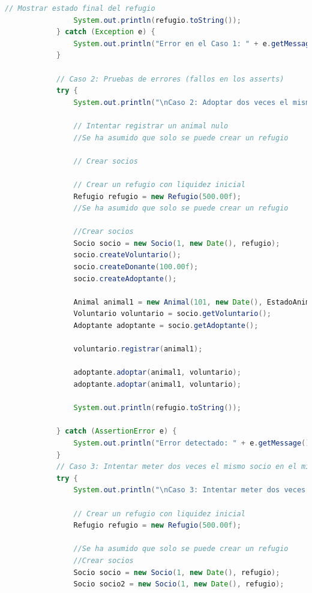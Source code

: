 \begin{lstlisting}[style = javaNormal, language=Java]
                // Mostrar estado final del refugio
                System.out.println(refugio.toString());
            } catch (Exception e) {
                System.out.println("Error en el Caso 1: " + e.getMessage());
            }
    
            // Caso 2: Pruebas de errores (fallos en los asserts)
            try {
                System.out.println("\nCaso 2: Adoptar dos veces el mismo animal\n");
    
                // Intentar registrar un animal nulo
                //Se ha asumido que solo se puede crear un refugio
    
                // Crear socios
    
                // Crear un refugio con liquidez inicial
                Refugio refugio = new Refugio(500.00f);
                //Se ha asumido que solo se puede crear un refugio
    
                //Crear socios
                Socio socio = new Socio(1, new Date(), refugio);
                socio.createVoluntario();
                socio.createDonante(100.00f);
                socio.createAdoptante();
    
                Animal animal1 = new Animal(101, new Date(), EstadoAnimal.ENTRATAMIENTO);
                Voluntario voluntario = socio.getVoluntario();
                Adoptante adoptante = socio.getAdoptante();
    
                voluntario.registrar(animal1);
    
                adoptante.adoptar(animal1, voluntario);
                adoptante.adoptar(animal1, voluntario);
    
                System.out.println(refugio.toString());
    
            } catch (AssertionError e) {
                System.out.println("Error detectado: " + e.getMessage());
            }
            // Caso 3: Intentar meter dos veces el mismo socio en el mismo refugio
            try {
                System.out.println("\nCaso 3: Intentar meter dos veces el mismo socio en el mismo refugio\n");
    
                // Crear un refugio con liquidez inicial
                Refugio refugio = new Refugio(500.00f);
    
                //Se ha asumido que solo se puede crear un refugio
                //Crear socios
                Socio socio = new Socio(1, new Date(), refugio);
                Socio socio2 = new Socio(1, new Date(), refugio);
    

\end{lstlisting}
